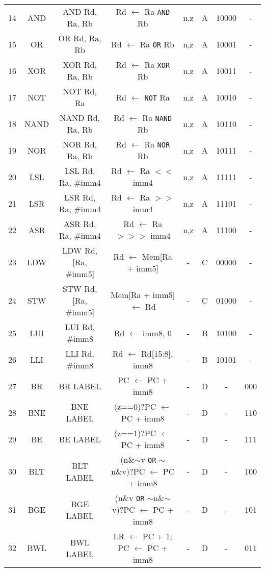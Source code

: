 \begin{minipage}[c]{\linewidth}
{\begin{tabular}{r|c|c|c|c|c|c|c|}
	14& AND   & AND Rd, Ra, Rb      & Rd $\leftarrow$ Ra \texttt{AND} Rb     & n,z     & A & 10000 & - \\
	15& OR    & OR Rd, Ra, Rb       & Rd $\leftarrow$ Ra \texttt{OR} Rb      & n,z     & A & 10001 & - \\
	16& XOR   & XOR Rd, Ra, Rb      & Rd $\leftarrow$ Ra \texttt{XOR} Rb     & n,z     & A & 10011 & - \\
	17& NOT   & NOT Rd, Ra          & Rd $\leftarrow$ \texttt{NOT} Ra        & n,z     & A & 10010 & - \\
	18& NAND  & NAND Rd, Ra, Rb     & Rd $\leftarrow$ Ra \texttt{NAND} Rb    & n,z     & A & 10110 & - \\
	19& NOR   & NOR Rd, Ra, Rb      & Rd $\leftarrow$ Ra \texttt{NOR} Rb     & n,z     & A & 10111 & - \\
	20& LSL   & LSL Rd, Ra, \#imm4  & Rd $\leftarrow$ Ra $<<$ imm4  & n,z     & A & 11111 & - \\
	21& LSR   & LSR Rd, Ra, \#imm4  & Rd $\leftarrow$ Ra $>>$ imm4  & n,z     & A & 11101 & - \\
	22& ASR   & ASR Rd, Ra, \#imm4  & Rd $\leftarrow$ Ra $>>>$ imm4 & n,z     & A & 11100 & - \\
	23& LDW   & LDW Rd, [Ra, \#imm5]& Rd $\leftarrow$ Mem[Ra + imm5]& -       & C & 00000 & - \\
	24& STW   & STW Rd, [Ra, \#imm5]& Mem[Ra + imm5] $\leftarrow$ Rd& -       & C & 01000 & - \\
	25& LUI   & LUI Rd, \#imm8      & Rd $\leftarrow$ {imm8, 0}     & -       & B & 10100 & - \\
	26& LLI   & LLI Rd, \#imm8      & Rd $\leftarrow$ {Rd[15:8], imm8}& -     & B & 10101 & - \\
	27& BR    & BR LABEL            & PC $\leftarrow$ PC + imm8     & -       & D & - & 000 \\
	28& BNE   & BNE LABEL           & (z==0)?PC $\leftarrow$ PC + imm8& -     & D & - & 110 \\
	29& BE    & BE LABEL            & (z==1)?PC $\leftarrow$ PC + imm8& -     & D & - & 111 \\
	30& BLT   & BLT LABEL           & (n\&$\sim$v \texttt{OR} $\sim$n\&v)?PC $\leftarrow$ PC + imm8& - & D & - & 100 \\
	31& BGE   & BGE LABEL           & (n\&v \texttt{OR} $\sim$n\&$\sim$v)?PC $\leftarrow$ PC + imm8& - & D & - & 101 \\
	32& BWL   & BWL LABEL           & LR $\leftarrow$ PC + 1; PC $\leftarrow$ PC + imm8& - & D & - & 011 \\

\end{tabular}}
\end{minipage}
